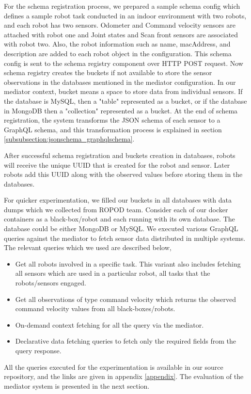 For the schema registration process, we prepared a sample schema config which defines a sample robot task conducted in an indoor environment with two robots, and each robot has two sensors. Odometer and Command velocity sensors are attached with robot one and Joint states and Scan front sensors are associated with robot two. Also, the robot information such as name, macAddress, and description are added to each robot object in the configuration. This schema config is sent to the schema registry component over HTTP POST request. Now schema registry creates the buckets if not available to store the sensor observations in the databases mentioned in the mediator configuration. In our mediator context, bucket means a space to store data from individual sensors. If the database is MySQL, then a "table" represented as a bucket, or if the database in MongoDB then a "collection" represented as a bucket. At the end of schema registration, the system transforms the JSON schema of each sensor to a GraphQL schema, and this transformation process is explained in section \ref{subsubsection:jsonschema_graphqlschema}. 

After successful schema registration and buckets creation in databases, robots will receive the unique UUID that is created for the robot and sensor. Later robots add this UUID along with the observed values before storing them in the databases. 

For quicker experimentation, we filled our buckets in all databases with data dumps which we collected from ROPOD team.  Consider each of our docker containers as a black-box/robot and each running with its own database. The database could be either MongoDB or MySQL. We executed various GraphQL queries against the mediator to fetch sensor data distributed in multiple systems. The relevant queries which we used are described below,
\begin{itemize}
	\item Get all robots involved in a specific task. This variant also includes fetching all sensors which are used in a particular robot, all tasks that the robots/sensors engaged.
	\item Get all observations of type command velocity which returns the observed command velocity values from all black-boxes/robots.
	\item On-demand context fetching for all the query via the mediator.
	\item Declarative data fetching queries to fetch only the required fields from the query response.
\end{itemize}


All the queries executed for the experimentation is available in our source repository, and the links are given in appendix \ref{appendix}. The evaluation of the mediator system is presented in the next section.


